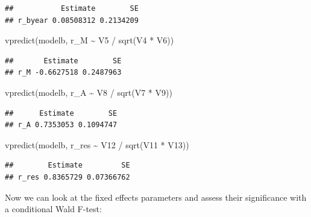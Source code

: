 \documentclass[
  12pt,
]{book}
\newenvironment{Shaded}{\begin{snugshade}}{\end{snugshade}}
\newcommand{\AttributeTok}[1]{\textcolor[rgb]{0.77,0.63,0.00}{#1}}
\newcommand{\ConstantTok}[1]{\textcolor[rgb]{0.00,0.00,0.00}{#1}}
\newcommand{\FunctionTok}[1]{\textcolor[rgb]{0.00,0.00,0.00}{#1}}
\newcommand{\NormalTok}[1]{#1}
\newcommand{\SpecialCharTok}[1]{\textcolor[rgb]{0.00,0.00,0.00}{#1}}
\newcommand{\StringTok}[1]{\textcolor[rgb]{0.31,0.60,0.02}{#1}}
\begin{document}
\begin{verbatim}
##           Estimate        SE
## r_byear 0.08508312 0.2134209
\end{verbatim}

\begin{Shaded}
\begin{Highlighting}[]
\FunctionTok{vpredict}\NormalTok{(modelb, r\_M }\SpecialCharTok{\textasciitilde{}}\NormalTok{ V5 }\SpecialCharTok{/} \FunctionTok{sqrt}\NormalTok{(V4 }\SpecialCharTok{*}\NormalTok{ V6))}
\end{Highlighting}
\end{Shaded}

\begin{verbatim}
##       Estimate        SE
## r_M -0.6627518 0.2487963
\end{verbatim}

\begin{Shaded}
\begin{Highlighting}[]
\FunctionTok{vpredict}\NormalTok{(modelb, r\_A }\SpecialCharTok{\textasciitilde{}}\NormalTok{ V8 }\SpecialCharTok{/} \FunctionTok{sqrt}\NormalTok{(V7 }\SpecialCharTok{*}\NormalTok{ V9))}
\end{Highlighting}
\end{Shaded}

\begin{verbatim}
##      Estimate        SE
## r_A 0.7353053 0.1094747
\end{verbatim}

\begin{Shaded}
\begin{Highlighting}[]
\FunctionTok{vpredict}\NormalTok{(modelb, r\_res }\SpecialCharTok{\textasciitilde{}}\NormalTok{ V12 }\SpecialCharTok{/} \FunctionTok{sqrt}\NormalTok{(V11 }\SpecialCharTok{*}\NormalTok{ V13))}
\end{Highlighting}
\end{Shaded}

\begin{verbatim}
##        Estimate         SE
## r_res 0.8365729 0.07366762
\end{verbatim}

Now we can look at the fixed effects parameters and assess their significance with a conditional Wald F-test:

\begin{Shaded}
\end{Shaded}
\end{document}
